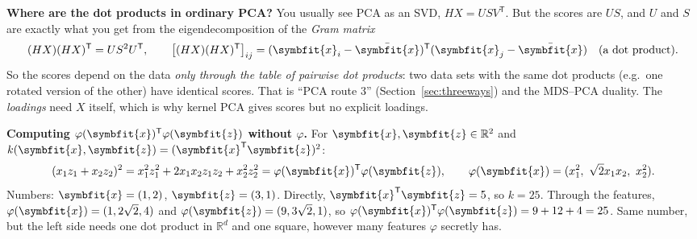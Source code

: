 \documentclass[11pt]{article}
\newcommand{\bm}[1]{\symbfit{#1}}
\newcommand{\R}{\mathbb{R}}
\newcommand{\vx}{\bm{x}}
\newcommand{\xbar}{\bar{\bm{x}}}
\newcommand{\T}{^{\mathsf T}}
\begin{document}
\begin{intuition}
\textbf{Where are the dot products in ordinary PCA?} You usually see PCA as an SVD, $HX=USV\T$. But the
scores are $US$, and $U$ and $S$ are exactly what you get from the eigendecomposition of the \emph{Gram matrix}
\[
(HX)(HX)\T=US^2U\T,\qquad \big[(HX)(HX)\T\big]_{ij}=(\vx_i-\xbar)\T(\vx_j-\xbar)\quad\text{(a dot product)}.
\]
So the scores depend on the data \emph{only through the table of pairwise dot products}: two data sets with the same
dot products (e.g.\ one rotated version of the other) have identical scores. That is ``PCA route 3''
(Section~\ref{sec:threeways}) and the MDS--PCA duality. The \emph{loadings} need $X$ itself, which is why kernel PCA gives
scores but no explicit loadings.

\textbf{Computing $\varphi(\vx)\T\varphi(\bm z)$ without $\varphi$.} For $\vx,\bm z\in\R^2$ and $k(\vx,\bm z)=(\vx\T\bm z)^2$:
\[
(x_1z_1+x_2z_2)^2=x_1^2z_1^2+2x_1x_2z_1z_2+x_2^2z_2^2=\varphi(\vx)\T\varphi(\bm z),\qquad \varphi(\vx)=(x_1^2,\ \sqrt2x_1x_2,\ x_2^2).
\]
Numbers: $\vx=(1,2)$, $\bm z=(3,1)$. Directly, $\vx\T\bm z=5$, so $k=25$. Through the features, $\varphi(\vx)=(1,2\sqrt2,4)$ and
$\varphi(\bm z)=(9,3\sqrt2,1)$, so $\varphi(\vx)\T\varphi(\bm z)=9+12+4=25$. Same number, but the left side needs one dot product in $\R^d$ and one
square, however many features $\varphi$ secretly has.
\end{intuition}
\end{document}
